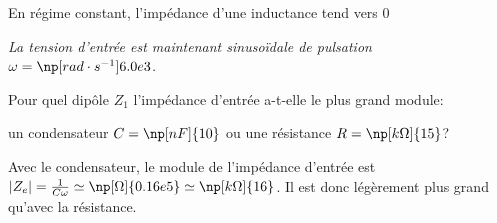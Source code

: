 
\begin{corrige}
  En régime constant, l’impédance d’une inductance tend vers \(0\)
\end{corrige}


\smallskip

{\itshape La tension d’entrée est maintenant sinusoïdale de pulsation \(\omega = \np[rad\cdot s^{-1}]{6.0e3}\).}


\begin{enonce}
  Pour quel dipôle \(Z_{1}\) l’impédance d’entrée a-t-elle le plus grand module: \minusMedskip\par
  un condensateur \(C = \np[nF]{10}\) ou une résistance \(R = \np[k\Omega]{15}\)?
\end{enonce}


\begin{corrige}
  Avec le condensateur, le module de l’impédance d’entrée est 
 	$|Z_{e}| = \frac{1}{C\omega} \simeq \np[\Omega]{0.16e5} \simeq \np[k\Omega]{16}$.
  Il est donc légèrement plus grand qu’avec la résistance.
\end{corrige}


\finEntrainement



\afficheReponsesMelangees

\finFicheEntrainement                                                                        %


\ifdefined\mainIsLoaded\else
\printReponsesEtCorriges
\fi
